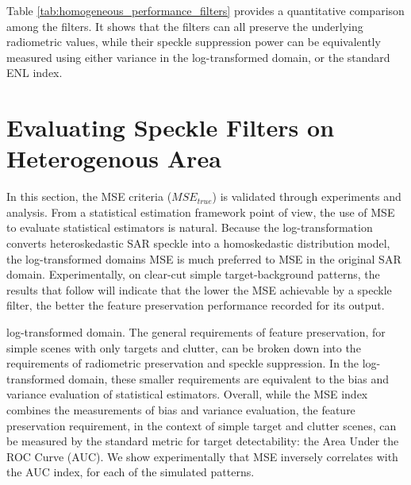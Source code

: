 \documentclass[journal]{IEEEtran}
\begin{document}
Table \ref{tab:homogeneous_performance_filters} provides a quantitative comparison among the filters.
It shows that the filters can all preserve the underlying radiometric values, while their speckle suppression power can be equivalently measured using either variance in the log-transformed domain, or the standard ENL index.

\section{Evaluating Speckle Filters on Heterogenous Area}
\label{sec:eval_hetero}


In this section, the MSE criteria ($MSE_{true}$) is validated through experiments and analysis. 
From a statistical estimation framework point of view, the use of MSE to evaluate statistical estimators is natural.
Because the log-transformation converts heteroskedastic SAR speckle into a homoskedastic distribution model, 
	the log-transformed domains MSE is much preferred to MSE in the original SAR domain.
Experimentally, on clear-cut simple target-background patterns, the results that follow will indicate that
	the lower the MSE achievable by a speckle filter,
	the better the feature preservation performance recorded for its output.

log-transformed domain. 
The general requirements of feature preservation, for simple scenes with only targets and clutter, can be broken 
down into the requirements of radiometric preservation and speckle suppression.
In the log-transformed domain, these smaller requirements are equivalent to the bias and variance evaluation of 
statistical estimators.
Overall, while the MSE index combines the measurements of bias and variance evaluation, 
	the feature preservation requirement, in the context of simple target and clutter scenes, can be measured by 
	the standard metric for target detectability: the Area Under the ROC Curve (AUC).
We show experimentally that MSE inversely correlates with the AUC index, for each of the simulated patterns.
\end{document}
